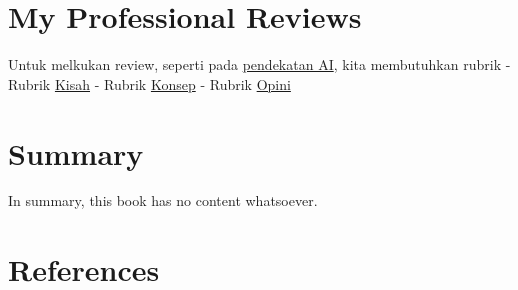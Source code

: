 \documentclass[
  letterpaper,
  DIV=11,
  numbers=noendperiod]{scrreprt}
\begin{document}

\chapter{My Professional Reviews}\label{my-professional-reviews}

Untuk melkukan review, seperti pada
\href{../My_Personal_Reviews/Doc.5.Mengevaluasi-Esai-Berdasarkan-Rubrik.pdf}{pendekatan
AI}, kita membutuhkan rubrik - Rubrik
\href{Dok.4.a.Rubrik_Kisah.pdf}{Kisah} - Rubrik
\href{Dok.4.b.Rubrik_Konsep.pdf}{Konsep} - Rubrik
\href{Dok.4.c.Rubrik_Opini.pdf}{Opini}


\chapter{Summary}\label{summary}

In summary, this book has no content whatsoever.


\chapter*{References}\label{references}


\label{refs}
\end{document}
